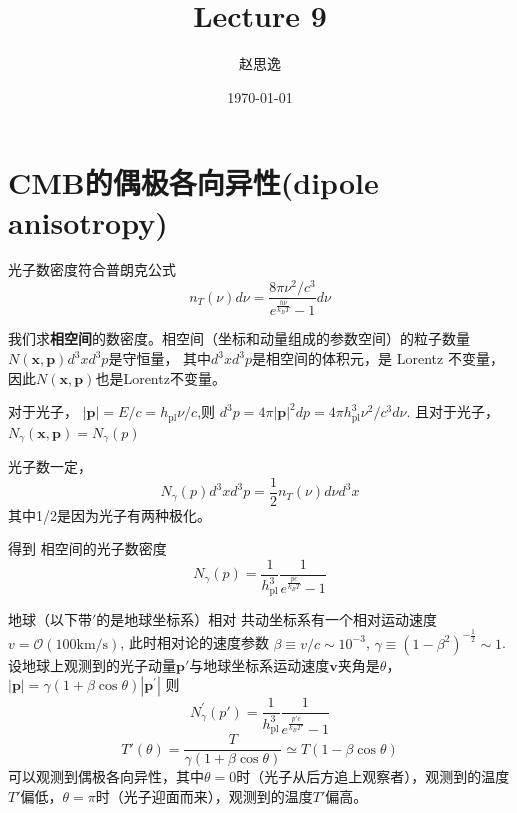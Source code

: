 \documentclass[12pt]{ctexart}
\title{Lecture 9}
\author{赵思逸}
\date{\today}
\begin{document}
\maketitle

\section{CMB的偶极各向异性(dipole anisotropy)}

光子数密度符合普朗克公式
\begin{equation}
    n_T\left(\nu\right) d\nu = \frac{8\pi \nu^2 /c^3}{e^\frac{h\nu}{k_B T}-1} d\nu
\end{equation}

我们求\textbf{相空间}的数密度。相空间（坐标和动量组成的参数空间）的粒子数量 $N\left(\boldsymbol{x},\boldsymbol{p}\right) d^3x d^3p$是守恒量， 其中$d^3x d^3p$是相空间的体积元，是 Lorentz 不变量， 因此$N\left(\boldsymbol{x},\boldsymbol{p}\right)$也是Lorentz不变量。

对于光子， $|\boldsymbol{p}|=E/c=h_{\mathrm{pl}} \nu/c$,则 $d^3p=4\pi |\boldsymbol{p}|^2 dp=4\pi h_{\mathrm{pl}}^3 \nu^2/c^3 d\nu$. 且对于光子， $N_\gamma(\boldsymbol{x},\boldsymbol{p})=N_\gamma\left(p\right) $

光子数一定，
\begin{equation}
    N_\gamma(p)d^3x d^3p = \frac{1}{2} n_T\left(\nu\right) d\nu d^3x
\end{equation}
其中1/2是因为光子有两种极化。

得到 相空间的光子数密度
\begin{equation}
    N_\gamma(p) = \frac{1}{h_{\mathrm{pl}}^3} \frac{1}{e^\frac{pc}{k_B T}-1}
\end{equation}

地球（以下带$'$的是地球坐标系）相对 共动坐标系有一个相对运动速度
$v = \mathcal{O} \left(100 \mathrm{km/s}\right) $, 
此时相对论的速度参数
$\beta \equiv v/c\sim 10^{-3}$,
$\gamma \equiv \left(1-\beta^2\right)^{-\frac{1}{2}}\sim 1$. 
设地球上观测到的光子动量$\boldsymbol{p'}$与地球坐标系运动速度$\boldsymbol{v}$夹角是$\theta$，$|\boldsymbol{p}| =\gamma \left(1+\beta \cos \theta \right) |\boldsymbol{p^\prime}|$
则
\begin{equation}
    N_\gamma^\prime(p') = \frac{1}{h_{\mathrm{pl}}^3} \frac{1}{e^\frac{p'c}{k_B T'}-1}
\end{equation}
\begin{equation}
    T'\left(\theta\right) = \frac{T}{\gamma \left(1+\beta \cos \theta\right) } \simeq T\left(1-\beta \cos \theta\right) 
\end{equation}
可以观测到偶极各向异性，其中$\theta=0$时（光子从后方追上观察者），观测到的温度$T'$偏低，$\theta=\pi$时（光子迎面而来），观测到的温度$T'$偏高。
\end{document}
